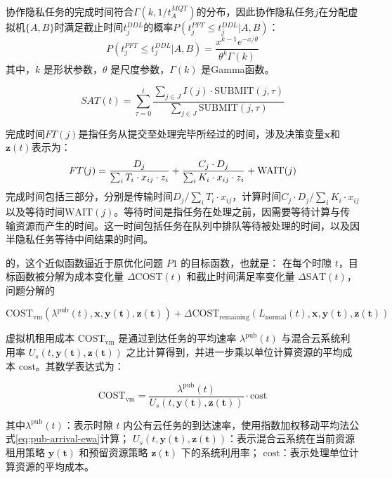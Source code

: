 协作隐私任务的完成时间符合\(\Gamma(k, 1/t^{MQT}_A)\)的分布，因此协作隐私任务\(j\)在分配虚拟机\(\{A, B\}\)时满足截止时间\(t^{DDL}_j\)的概率\(P(t^{PFT}_j \le t^{DDL}_j | {A, B})\)：
\begin{equation}
    P(t^{PFT}_j \le t^{DDL}_j | {A, B}) =  \frac{x^{k-1} e^{-x/\theta}}{\theta^k \Gamma(k)}
    \label{eq:semi-sat-probability}
\end{equation}
其中，\(k\) 是形状参数，\(\theta\) 是尺度参数，\(\Gamma(k)\)
是Gamma函数。

\[SAT(t) = \sum_{\tau=0}^{t}\frac{\sum_{j \in J} I(j)\cdot \text{SUBMIT}(j, \tau)}{\sum_{j \in J} \text{SUBMIT}(j, \tau)}\]

完成时间\(FT(j)\)是指任务从提交至处理完毕所经过的时间，涉及决策变量$\mathbf{x}$和$\mathbf{z}(t)$表示为： \[
    FT(j) = \frac{D_j}{\sum_i T_i\cdot x_{ij} \cdot z_i}\\
    +\frac{C_j\cdot D_j}{\sum_i K_i\cdot x_{ij} \cdot z_i} + \text{WAIT}(j)
\]
完成时间包括三部分，分别是传输时间\({D_j}/{\sum_i T_i\cdot x_{ij}}\)，计算时间\({C_j\cdot D_j}/{\sum_i K_i\cdot x_{ij}}\)以及等待时间\(\text{WAIT}(j)\)。等待时间是指任务在处理之前，因需要等待计算与传输资源而产生的时间。这一时间包括任务在队列中排队等待被处理的时间，以及因半隐私任务等待中间结果的时间。

的，这个近似函数逼近于原优化问题 \(P1\) 的目标函数，也就是：
在每个时隙 \(t\)，目标函数被分解为成本变化量 \(\Delta \text{COST}(t)\) 和截止时间满足率变化量 \(\Delta \text{SAT}(t)\)，问题分解的

\[
    \text{COST}_{\text{vm}}(\lambda^{\text{pub}}(t), \mathbf{x}, \mathbf{y(t)}, \mathbf{z(t)}) + \Delta \text{COST}_{\text{remaining}}(L_{\text{normal}}(t), \mathbf{x}, \mathbf{y(t)}, \mathbf{z(t)})
\]

虚拟机租用成本 \(\text{COST}_{\text{vm}}\) 是通过到达任务的平均速率 $ \lambda^{\text{pub}}(t) $ 与混合云系统利用率 \(U_s(t, \mathbf{y(t)}, \mathbf{z(t)})\) 之比计算得到，并进一步乘以单位计算资源的平均成本 \(\text{cost}\)。其数学表达式为：

\[
    \text{COST}_{\text{vm}} = \frac{\lambda^{\text{pub}}(t)}{U_s(t, \mathbf{y(t)}, \mathbf{z(t)})} \cdot \text{cost}
\]

其中\(\lambda^{\text{pub}}(t)\)：表示时隙 \(t\) 内公有云任务的到达速率，使用指数加权移动平均法公式\eqref{eq:pub-arrival-ewa}计算；
\(U_s(t, \mathbf{y(t)}, \mathbf{z(t)})\)：表示混合云系统在当前资源租用策略 \(\mathbf{y(t)}\) 和预留资源策略 \(\mathbf{z(t)}\) 下的系统利用率；
\(\text{cost}\)：表示处理单位计算资源的平均成本。

